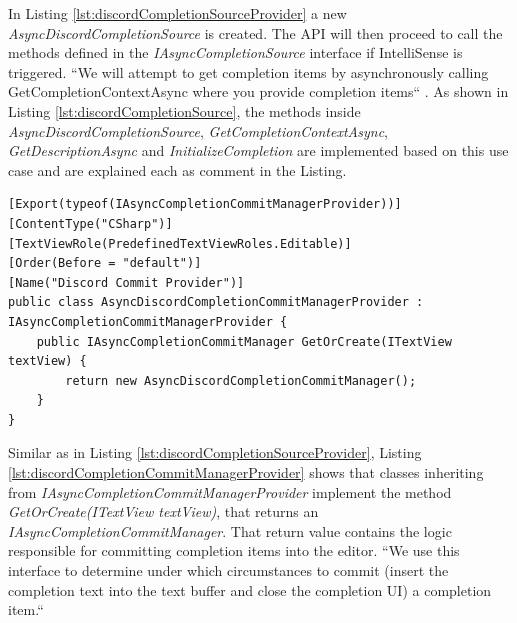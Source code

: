 In Listing \ref{lst:discordCompletionSourceProvider} a new \textit{AsyncDiscordCompletionSource} is created. The API will then proceed to call the methods defined in the \textit{IAsyncCompletionSource} interface if IntelliSense is triggered.  ``We will attempt to get completion items by asynchronously calling GetCompletionContextAsync where you provide completion items`` \citep{asynccompletionapiissue}.
As shown in Listing \ref{lst:discordCompletionSource}, the methods inside \textit{AsyncDiscordCompletionSource}, \textit{GetCompletionContextAsync}, \textit{GetDescriptionAsync} and \textit{InitializeCompletion} are implemented based on this use case and are explained each as comment in the Listing.

\begin{lstlisting}[style=CSharp, caption={Discord Completion Commit Manager Provider}, label={lst:discordCompletionCommitManagerProvider}]
[Export(typeof(IAsyncCompletionCommitManagerProvider))]
[ContentType("CSharp")]
[TextViewRole(PredefinedTextViewRoles.Editable)]
[Order(Before = "default")]
[Name("Discord Commit Provider")]
public class AsyncDiscordCompletionCommitManagerProvider : IAsyncCompletionCommitManagerProvider {
	public IAsyncCompletionCommitManager GetOrCreate(ITextView textView) {
		return new AsyncDiscordCompletionCommitManager();
	}
}
\end{lstlisting}
Similar as in Listing \ref{lst:discordCompletionSourceProvider}, Listing \ref{lst:discordCompletionCommitManagerProvider} shows that classes inheriting from \textit{IAsyncCompletionCommitManagerProvider} implement the method \textit{GetOrCreate(ITextView textView)}, that returns an \textit{IAsyncCompletionCommitManager}. That return value contains the logic responsible for committing completion items into the editor. ``We use this interface to determine under which circumstances to commit (insert the completion text into the text buffer and close the completion UI) a completion item.`` \citep{asynccompletionapiissue}

